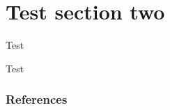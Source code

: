 \documentclass{beamer}
\begin{document}
\section{Test section two}
\begin{frame} Test \end{frame}
\begin{frame} Test \end{frame}

\begin{frame}[allowframebreaks]
  \frametitle{References}
  
  
\end{frame}
\end{document}
